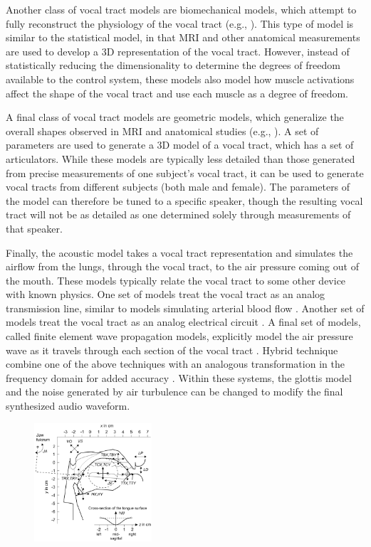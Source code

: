\documentclass{article}
\begin{document}
Another class of vocal tract models
are biomechanical models,
which attempt to fully reconstruct
the physiology of the vocal tract
(e.g., \citealp{dang2004}).
This type of model is similar
to the statistical model,
in that MRI and other anatomical measurements
are used to develop a 3D representation
of the vocal tract.
However, instead of statistically
reducing the dimensionality
to determine the degrees of freedom
available to the control system,
these models also model how
muscle activations affect the shape
of the vocal tract
and use each muscle
as a degree of freedom.

A final class of vocal tract models
are geometric models,
which generalize the overall
shapes observed in
MRI and anatomical studies
(e.g., \citep{mermelstein1973}).
A set of parameters
are used to generate a 3D model
of a vocal tract,
which has a set of articulators.
While these models are typically
less detailed than those
generated from precise
measurements of one subject's vocal tract,
it can be used to generate vocal tracts
from different subjects
(both male and female).
The parameters of the model
can therefore be tuned to a specific speaker,
though the resulting vocal tract
will not be as detailed
as one determined solely through
measurements of that speaker.

Finally, the acoustic model takes
a vocal tract representation
and simulates the airflow from
the lungs, through the vocal tract,
to the air pressure coming out of the mouth.
These models typically relate
the vocal tract to some other
device with known physics.
One set of models treat the vocal tract
as an analog transmission line,
similar to models simulating
arterial blood flow \citep{meyer1989}.
Another set of models treat the vocal tract
as an analog electrical circuit
\citep{maeda1982}.
A final set of models,
called finite element wave propagation models,
explicitly model the air pressure wave
as it travels through each section
of the vocal tract \citep{elmasri1996}.
Hybrid technique combine one
of the above techniques
with an analogous transformation
in the frequency domain for added accuracy
\citep{sondhi1987}.
Within these systems, the glottis model
and the noise generated
by air turbulence can be changed
to modify the final synthesized audio waveform.

\begin{figure}
  \vspace{-30pt}
  \begin{center}
    \includegraphics[width=0.39\textwidth]{birholz-params}
  \end{center}
  \vspace{-24pt}
\end{figure}
\end{document}
